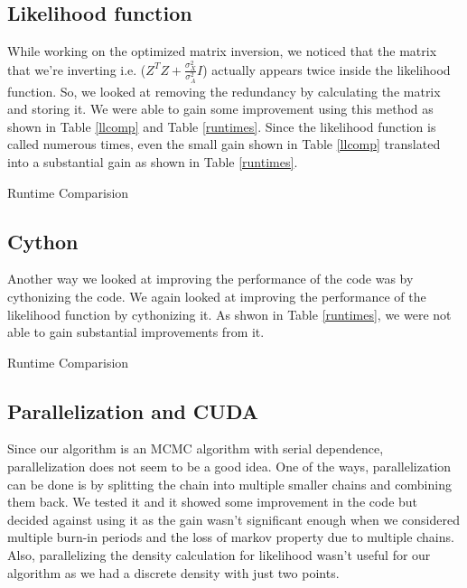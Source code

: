 \documentclass{article}
\begin{document}
\subsection{Likelihood function}
While working on the optimized matrix inversion, we noticed that the matrix that we're inverting i.e. ($Z^TZ+\frac{\sigma_X^2}{\sigma_A^2}I$) actually appears twice inside the likelihood function. So, we looked at removing the redundancy by calculating the matrix and storing it. We were able to gain some improvement using this method as shown in Table \ref{llcomp} and Table \ref{runtimes}. Since the likelihood function is called numerous times, even the small gain shown in Table \ref{llcomp} translated into a substantial gain as shown in Table \ref{runtimes}.\\


\begin{table}[ht]
\centering
\caption{Runtime Comparision \label{llcomp}}


\end{table}

\subsection{Cython}
Another way we looked at improving the performance of the code was by cythonizing the code. We again looked at improving the performance of the likelihood function by cythonizing it. As shwon in Table \ref{runtimes}, we were not able to gain substantial improvements from it.\\

\begin{table}[ht]
\centering
\caption{Runtime Comparision \label{runtimes}}

\end{table}

\subsection{Parallelization and CUDA}
Since our algorithm is an MCMC algorithm with serial dependence, parallelization does not seem to be a good idea. One of the ways, parallelization can be done is by splitting the chain into multiple smaller chains and combining them back. We tested it and it showed some improvement in the code but decided against using it as the gain wasn't significant enough when we considered multiple burn-in periods and the loss of markov property due to multiple chains. Also, parallelizing the density calculation for likelihood wasn't useful for our algorithm as we had a discrete density with just two points.
\end{document}
